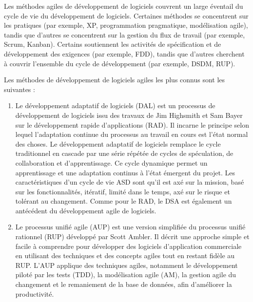 Les méthodes agiles de développement de logiciels couvrent un large éventail du cycle de vie du
développement de logiciels. Certaines méthodes se concentrent sur les
pratiques (par exemple, XP, programmation pragmatique, modélisation agile),
tandis que d'autres se concentrent sur la gestion du flux de travail
(par exemple, Scrum, Kanban). Certains soutiennent les activités de spécification et
de développement des exigences (par exemple, FDD), tandis que d'autres cherchent à couvrir
l'ensemble du cycle de développement (par exemple, DSDM, RUP).

Les méthodes de développement de logiciels agiles les plus connus sont les suivantes :


\begin{enumerate}
    \item Le développement adaptatif de logiciels (DAL) est un processus de développement de
    logiciels issu des travaux de Jim Highsmith et Sam Bayer sur le développement rapide
    d'applications (RAD). Il incarne le principe selon lequel l'adaptation continue du processus au
    travail en cours est l'état normal des choses.
    Le développement adaptatif de logiciels remplace le cycle traditionnel en
    cascade par une série répétée de cycles de spéculation, de collaboration et
    d'apprentissage. Ce cycle dynamique permet un apprentissage et une adaptation
    continus à l'état émergent du projet. Les caractéristiques d'un cycle de vie ASD
    sont qu'il est axé sur la mission, basé sur les fonctionnalités, itératif,
    limité dans le temps, axé sur le risque et tolérant au changement. Comme pour
    le RAD, le DSA est également un antécédent du développement agile de logiciels.

    \item Le processus unifié agile (AUP) est une version simplifiée
    du processus unifié rationnel (RUP) développé par Scott Ambler.
    Il décrit une approche simple et facile à comprendre pour développer des logiciels d'application commerciale en utilisant des techniques et des concepts agiles tout en restant fidèle au RUP.
    L'AUP applique des techniques agiles, notamment le développement piloté par
    les tests (TDD), la modélisation agile (AM),
    la gestion agile du changement et le remaniement de la base de données,
    afin d'améliorer la productivité.


\end{enumerate}
